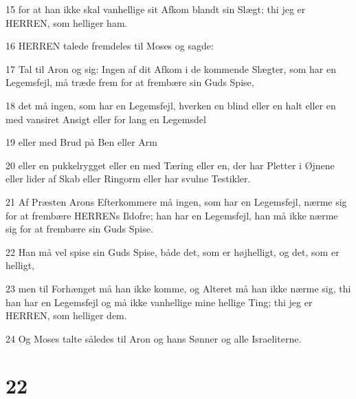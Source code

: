 \par 15 for at han ikke skal vanhellige sit Afkom blandt sin Slægt; thi jeg er HERREN, som helliger ham.
\par 16 HERREN talede fremdeles til Moses og sagde:
\par 17 Tal til Aron og sig: Ingen af dit Afkom i de kommende Slægter, som har en Legemsfejl, må træde frem for at frembære sin Guds Spise,
\par 18 det må ingen, som har en Legemsfejl, hverken en blind eller en halt eller en med vansiret Ansigt eller for lang en Legemsdel
\par 19 eller med Brud på Ben eller Arm
\par 20 eller en pukkelrygget eller en med Tæring eller en, der har Pletter i Øjnene eller lider af Skab eller Ringorm eller har svulne Testikler.
\par 21 Af Præsten Arons Efterkommere må ingen, som har en Legemsfejl, nærme sig for at frembære HERRENs Ildofre; han har en Legemsfejl, han må ikke nærme sig for at frembære sin Guds Spise.
\par 22 Han må vel spise sin Guds Spise, både det, som er højhelligt, og det, som er helligt,
\par 23 men til Forhænget må han ikke komme, og Alteret må han ikke nærme sig, thi han har en Legemsfejl og må ikke vanhellige mine hellige Ting; thi jeg er HERREN, som helliger dem.
\par 24 Og Moses talte således til Aron og hans Sønner og alle Israeliterne.

\chapter{22}

